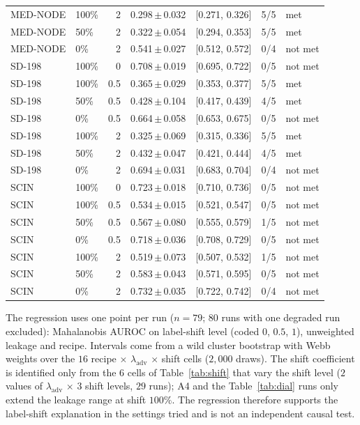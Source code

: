 \documentclass{midl}
\newcommand{\lam}{\lambda_{\mathrm{adv}}}
\begin{document}
\begin{table}[h]
\begin{tabular}{llrccll}
MED-NODE & 100\% & 2 & 0.298\,$\pm$\,0.032 & [0.271, 0.326] & 5/5 & met \\
MED-NODE & 50\% & 2 & 0.322\,$\pm$\,0.054 & [0.294, 0.353] & 5/5 & met \\
MED-NODE & 0\% & 2 & 0.541\,$\pm$\,0.027 & [0.512, 0.572] & 0/4 & not met \\
SD-198 & 100\% & 0 & 0.708\,$\pm$\,0.019 & [0.695, 0.722] & 0/5 & not met \\
SD-198 & 100\% & 0.5 & 0.365\,$\pm$\,0.029 & [0.353, 0.377] & 5/5 & met \\
SD-198 & 50\% & 0.5 & 0.428\,$\pm$\,0.104 & [0.417, 0.439] & 4/5 & met \\
SD-198 & 0\% & 0.5 & 0.664\,$\pm$\,0.058 & [0.653, 0.675] & 0/5 & not met \\
SD-198 & 100\% & 2 & 0.325\,$\pm$\,0.069 & [0.315, 0.336] & 5/5 & met \\
SD-198 & 50\% & 2 & 0.432\,$\pm$\,0.047 & [0.421, 0.444] & 4/5 & met \\
SD-198 & 0\% & 2 & 0.694\,$\pm$\,0.031 & [0.683, 0.704] & 0/4 & not met \\
SCIN & 100\% & 0 & 0.723\,$\pm$\,0.018 & [0.710, 0.736] & 0/5 & not met \\
SCIN & 100\% & 0.5 & 0.534\,$\pm$\,0.015 & [0.521, 0.547] & 0/5 & not met \\
SCIN & 50\% & 0.5 & 0.567\,$\pm$\,0.080 & [0.555, 0.579] & 1/5 & not met \\
SCIN & 0\% & 0.5 & 0.718\,$\pm$\,0.036 & [0.708, 0.729] & 0/5 & not met \\
SCIN & 100\% & 2 & 0.519\,$\pm$\,0.073 & [0.507, 0.532] & 1/5 & not met \\
SCIN & 50\% & 2 & 0.583\,$\pm$\,0.043 & [0.571, 0.595] & 0/5 & not met \\
SCIN & 0\% & 2 & 0.732\,$\pm$\,0.035 & [0.722, 0.742] & 0/4 & not met \\
\bottomrule
\end{tabular}
\end{table}

The regression uses one point per run ($n=79$; $80$ runs with one degraded run excluded): Mahalanobis AUROC on label-shift level
(coded $0$, $0.5$, $1$), unweighted leakage and recipe. Intervals come from a wild cluster
bootstrap with Webb weights over the $16$ recipe $\times$ $\lam$ $\times$ shift cells ($2{,}000$ draws).
The shift coefficient is identified only from the $6$ cells of Table~\ref{tab:shift} that vary the shift level
($2$ values of $\lam$ $\times$ $3$ shift levels, $29$ runs); A4 and the Table~\ref{tab:dial} runs only extend the leakage range at shift $100\%$.
The regression therefore supports the label-shift explanation in the settings tried and is not
an independent causal test.
\end{document}
